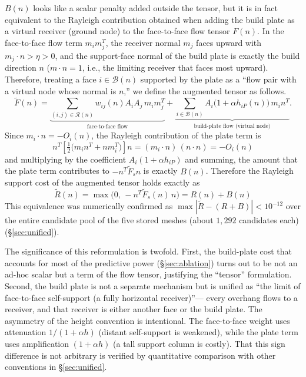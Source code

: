 \documentclass[11pt,a4paper]{article}
\begin{document}
$B(n)$ looks like a scalar penalty added outside the tensor,
but it is in fact equivalent to the Rayleigh contribution obtained when adding the build plate as a virtual receiver (ground node)
to the face-to-face flow tensor $F(n)$.
In the face-to-face flow term $m_im_j^T$, the receiver normal $m_j$ faces upward with $m_j\cdot n>\eta>0$,
and the support-face normal of the build plate is exactly the build direction $n$
($m\cdot n=1$, i.e., the limiting receiver that faces most upward).
Therefore, treating a face $i\in\mathcal{B}(n)$ supported by the plate as a ``flow pair with a virtual node whose normal is $n$,''
we define the augmented tensor as follows.
\begin{equation}
\tilde F(n)
=
\underbrace{\sum_{(i,j)\in\mathcal{R}(n)} w_{ij}(n)A_iA_j\,m_im_j^T}_{\text{face-to-face flow}}
+
\underbrace{\sum_{i\in\mathcal{B}(n)} A_i\big(1+\alpha h_{iP}(n)\big)\,m_in^T}_{\text{build-plate flow (virtual node)}}.
\end{equation}
Since $m_i\cdot n=-O_i(n)$, the Rayleigh contribution of the plate term is
\begin{equation}
n^T\!\left[\tfrac{1}{2}\big(m_in^T+nm_i^T\big)\right]\!n
= (m_i\cdot n)\,(n\cdot n) = -O_i(n)
\end{equation}
and multiplying by the coefficient $A_i(1+\alpha h_{iP})$ and summing,
the amount that the plate term contributes to $-n^T\tilde F_s n$ is exactly $B(n)$.
Therefore the Rayleigh support cost of the augmented tensor holds exactly as
\begin{equation}
\tilde R(n)
=
\max\!\big(0,\,-n^T\tilde F_s(n)\,n\big)
=
R(n)+B(n)
\label{eq:Rtilde}
\end{equation}
This equivalence was numerically confirmed as $\max|\tilde R-(R+B)|<10^{-12}$ over the entire candidate pool of the five stored meshes
(about $1{,}292$ candidates each) (\S\ref{sec:unified}).

The significance of this reformulation is twofold.
First, the build-plate cost that accounts for most of the predictive power (\S\ref{sec:ablation})
turns out to be not an ad-hoc scalar but a term of the flow tensor, justifying the ``tensor'' formulation.
Second, the build plate is not a separate mechanism but is unified as
``the limit of face-to-face self-support (a fully horizontal receiver)''---
every overhang flows to a receiver, and that receiver is either another face or the build plate.
The asymmetry of the height convention is intentional.
The face-to-face weight uses attenuation $1/(1+\alpha h)$ (distant self-support is weakened),
while the plate term uses amplification $(1+\alpha h)$ (a tall support column is costly).
That this sign difference is not arbitrary is verified by quantitative comparison with other conventions in \S\ref{sec:unified}.
\end{document}
